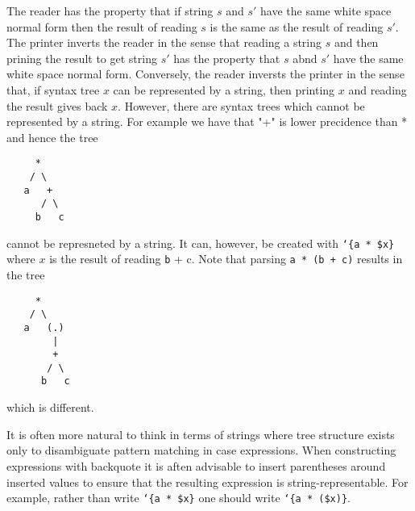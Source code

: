 \documentclass{article}
\newcommand{\mtt}[1]{\mbox{\tt #1}}
\begin{document}
The reader has the property that if string $s$ and $s'$ have the same white space normal form then the result of reading
$s$ is the same as the result of reading $s'$.  The printer inverts the reader
in the sense that reading a string $s$ and then prining the result to get string $s'$ has the property that $s$ abnd $s'$ have the same white space normal form.
Conversely, the reader inversts the printer in the sense that, if syntax tree $x$ can be represented by a string, then printing $x$ and reading the result gives back $x$.
However, there are syntax trees which cannot be represented by a string.  For example we have that "+" is lower precidence than * and hence the tree
\begin{verbatim}
     *
    / \
   a   +
      / \
     b   c
\end{verbatim}
cannot be represneted by a string. It can, however, be created with {\tt `\{a * \$x\}} where $x$ is the result of reading {\mtt b + c}.
Note that parsing {\tt a * (b + c)} results in the tree
\begin{verbatim}
     *
    / \
   a   (.)
        |
        +
       / \
      b   c
\end{verbatim}
which is different.

It is often more natural to think in terms of strings where tree structure exists only to disambiguate
pattern matching in case expressions.  When constructing expressions with backquote it is aften advisable to insert
parentheses around inserted values to ensure that the resulting expression is string-representable.  For example,
rather than write {\tt `\{a * \$x\}} one should write {\tt `\{a * (\$x)\}}.
\end{document}
